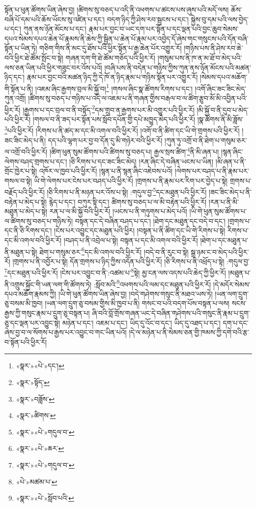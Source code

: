 སྟོན་པ་ཕུན་ཚོགས་ཡིན་ཞེས་བྱ། །ཚིགས་སུ་བཅད་པ་འདི་ནི་འཕགས་པ་ཚངས་པས་ཞུས་པའི་མདོ་ལས། ཆོས་བཞི་པོ་དམ་པའི་ཆོས་ཡོངས་སུ་འཛིན་པ་དང་། བདག་ཉིད་ཀྱི་ཤེས་རབ་སྦྱངས་པ་དང་། སྐྱེས་བུ་དམ་པའི་ལས་བྱེད་པ་དང་། ཀུན་ནས་ཉོན་མོངས་པ་དང་། རྣམ་པར་བྱང་བ་ཡང་དག་པར་སྟོན་པ་དང་ལྡན་པའི་བྱང་ཆུབ་སེམས་དཔའ་སེམས་དཔའ་ཆེན་པོ་རྣམས་ནི་ཆེས་ཀྱི་སྦྱིན་པ་ཆེན་པོ་རྣམ་པར་འབྱེད་དོ་ཞེས་གང་གསུངས་པའི་དོན་བཞི་སྟོན་པ་ཡིན་ཏེ། གཅིག་གིས་ནི་མང་དུ་ཐོས་པའི་ཕྱིར་སྟོན་པ་རྒྱ་ཆེན་པོར་འགྱུར་རོ། །གཉིས་པས་ནི་ཤེས་རབ་ཆེ་བའི་ཕྱིར་ཐེ་ཚོམ་སྤོང་བ་སྟེ། གཞན་དག་གི་ཐེ་ཚོམ་གཅོད་པའི་ཕྱིར་རོ། །གསུམ་པས་ནི་ཁ་ན་མ་ཐོ་བ་མེད་པའི་ལས་ཅན་ཡིན་པའི་ཕྱིར་གཟུང་བར་འོས་པའོ། །བཞི་པས་ནི་བདེན་པ་གཉིས་ཀྱིས་ཀུན་ནས་ཉོན་མོངས་པའི་མཚན་ཉིད་དང་། རྣམ་པར་བྱང་བའི་མཚན་ཉིད་ཀྱི་དེ་ཁོ་ན་ཉིད་རྣམ་པ་གཉིས་སྟོན་པར་འགྱུར་རོ། །སེམས་དཔའ་མཆོག་གི་སྟོན་པ་ནི། །འཇམ་ཞིང་རྒྱགས་བྲལ་མི་སྐྱོ་བ།\footnote{«སྣར་»«པེ་»དང་།} །གསལ་ཞིང་སྣ་ཚོགས་རིགས་པ་དང་། །འགོ་ཞིང་ཟང་ཟིང་མེད་ཀུན་འགྲོ། །ཚིགས་སུ་བཅད་པ་གཉིས་པ་འདི་ལ་འཇམ་པ་ནི་གཞན་གྱིས་བརྒལ་བ་ལ་ཚིག་རྩུབ་མོ་མི་འབྱིན་པའི་ཕྱིར་རོ། །རྒྱགས་པ་དང་བྲལ་བ་ནི་བསྟོད་\footnote{«སྣར་»སྟོད་}དམ་གྲུབ་ན་རྒྱགས་པར་མི་འགྱུར་པའི་ཕྱིར་རོ། །མི་སྐྱོ་བ་ནི་དུབ་པ་མེད་པའི་ཕྱིར་རོ། །གསལ་བ་ནི་ཟད་པར་སྟོན་པས་སློབ་དཔོན་གྱི་དཔེ་མཁྱུད་མེད་པའི་ཕྱིར་རོ། །སྣ་ཚོགས་ནི་མི་ཟློས་\footnote{«སྣར་»བཟློས་}པའི་ཕྱིར་རོ། །རིགས་པ་ནི་ཚད་མ་དང་མི་འགལ་བའི་ཕྱིར་རོ། །འགོ་བ་ནི་ཚིག་དང་ཡི་གེ་གྲགས་པའི་ཕྱིར་རོ། །ཟང་ཟིང་མེད་པ་ནི། དད་པའི་ལྷག་པར་བྱ་བ་དོན་དུ་མི་གཉེར་བའི་ཕྱིར་རོ། །ཀུན་ཏུ་འགྲོ་བ་ནི་ཐེག་པ་གསུམ་ཅར་ལ་འགྲོ་བའི་ཕྱིར་རོ། །ཚིག་ཕུན་སུམ་ཚོགས་པའི་ཚིགས་སུ་བཅད་པ། རྒྱལ་སྲས་ཚིག་\footnote{«སྣར་»ཚིགས་}ནི་མི་ཞན་པ། །སྙན་ཞིང་ལེགས་བཤད་གྲགས་པ་དང་། །ཅི་རིགས་པ་དང་ཟང་ཟིང་མེད། །རན་ཞིང་དེ་བཞིན་ཡངས་པ་ཡིན། །མི་ཞན་པ་ནི་གྲོང་ཁྱེར་པ་སྟེ། འཁོར་ལ་ཁྱབ་པའི་ཕྱིར་རོ། །སྙན་པ་ནི་སྙན་ཞིང་འཇེབས་པའོ། །ལེགས་པར་བཤད་པ་ནི་རྣམ་པར་གསལ་བ་སྟེ། ཡི་གེ་ལེགས་པར་ངེས་པར་བཤད་པའི་ཕྱིར་རོ། །གྲགས་པ་ནི་རྣམ་པར་རིག་པར་བྱེད་པ་སྟེ། གྲགས་པ་བརྗོད་པའི་ཕྱིར་རོ། །ཅི་རིགས་པ་ནི་མཉན་པར་འོས་པ་སྟེ། :གདུལ་བྱ་\footnote{«སྣར་»«པེ་»གདུལ་བ་}དང་མཐུན་པའི་ཕྱིར་རོ། །ཟང་ཟིང་མེད་པ་ནི་བརྟེན་པ་མེད་པ་སྟེ། རྙེད་པ་དང་། བཀུར་སྟི་དང་། ཚིགས་སུ་བཅད་པ་ལ་མི་བརྟེན་པའི་ཕྱིར་རོ། །རན་པ་ནི་མི་མཐུན་པ་མེད་པ་སྟེ། རན་པ་ལ་མི་སྐྱོ་བའི་ཕྱིར་རོ། །ཡངས་པ་ནི་གཏུགས་པ་མེད་པའོ། །ཡི་གེ་ཕུན་སུམ་ཚོགས་པ་ལ་ཚིགས་སུ་བཅད་པ་གཉིས་ཏེ། བསྟན་དང་དེ་བཞིན་བཤད་པ་དང་། །ཐེག་དང་མཐུན་དང་བདེ་བ་དང་། །གྲགས་པ་དང་ནི་ཅི་རིགས་དང་། །ངེས་པར་འབྱུང་དང་མཐུན་པའི་ཕྱིར། །བསྟན་པ་ནི་ཚིག་དང་ཡི་གེ་རིགས་པ་སྟེ། རིགས་པ་དང་མི་འགལ་བའི་ཕྱིར་རོ། །བཤད་པ་ནི་འབྲེལ་པ་སྟེ། བསྟན་པ་དང་མི་འགལ་བའི་ཕྱིར་རོ། །ཐེག་པ་དང་མཐུན་པ་ནི་མཐུན་པ་སྟེ། ཐེག་པ་གསུམ་ཅར་\footnote{«སྣར་»«པེ་»ཆར་}དང་མི་འགལ་བའི་ཕྱིར་རོ། །བདེ་བ་ནི་རུང་བ་སྟེ། སྒྲ་ཉམ་ང་བ་མེད་པའི་ཕྱིར་རོ། །གྲགས་པ་ནི་འབྱོར་པ་སྟེ། དོན་གྲགས་པ་ཉིད་ཀྱིས་འདོན་པའི་ཕྱིར་རོ། །ཅི་རིགས་པ་ནི་འཕྲོད་པ་སྟེ། :གདུལ་བྱ་\footnote{«སྣར་»«པེ་»གདུལ་བ་}དང་མཐུན་པའི་ཕྱིར་རོ། །ངེས་པར་འབྱུང་བ་ནི་:འཚམ་པ་\footnote{«པེ་»མཚམ་པ་}སྟེ། མྱ་ངན་ལས་འདས་པའི་ཆེད་ཀྱི་ཕྱིར་རོ། །མཐུན་པ་ནི་འགྲུས་སྐྱོང་གི་ཡན་ལག་གི་ཚོགས་ཏེ། :སློབ་མའི་\footnote{«སྣར་»«པེ་»སློབ་པའི་}འཕགས་པའི་ལམ་དང་མཐུན་པའི་ཕྱིར་རོ། །དེ་མདོར་སེམས་དཔའ་མཆོག་རྣམས་ཀྱི། །ཡི་གེ་ཕུན་ཚོགས་ཡིན་ཞེས་བྱ། །བདེ་གཤེགས་གསུང་ནི་མཐའ་ཡས་ཏེ། །ཡན་ལག་དྲུག་ཅུ་བསམ་མི་ཁྱབ། །ཡན་ལག་དྲུག་ཅུ་བསམ་གྱིས་མི་ཁྱབ་པ་ནི། གསང་བ་པའི་བདག་པོས་བསྟན་པ་ལས། སངས་རྒྱས་ཀྱི་གསུང་རྣམ་པ་དྲུག་ཅུ་བསྟན་པ། ཞི་བའི་བློ་གྲོས་གཞན་ཡང་དེ་བཞིན་གཤེགས་པའི་གསུང་ནི་རྣམ་པ་དྲུག་ཅུ་དང་ལྡན་པར་འབྱུང་སྟེ། མཉེན་པ་དང་། འཇམ་པ་དང་། ཡིད་དུ་འོང་བ་དང་། ཡིད་དུ་འཐད་པ་དང་། དག་པ་དང་ཞེས་བྱ་བ་ལ་སོགས་པ་རྒྱས་པར་འབྱུང་བ་གང་ཡིན་པའོ། །དེ་ལ་མཉེན་པ་ནི་སེམས་ཅན་གྱི་ཁམས་ཀྱི་དགེ་བའི་རྩ་བ་སྟོན་པའི་ཕྱིར་རོ། 